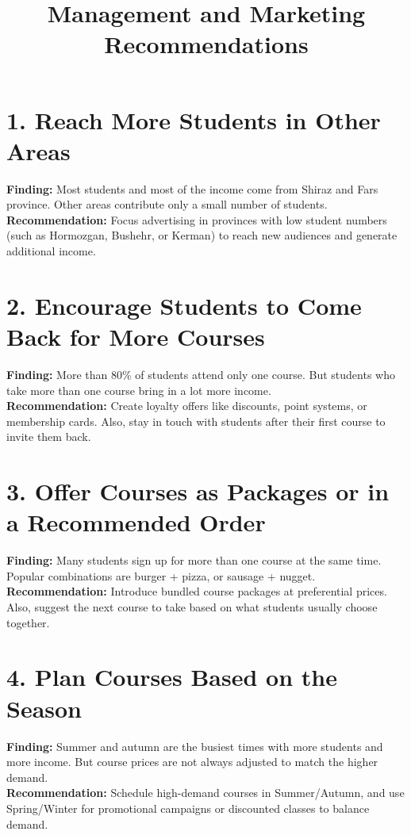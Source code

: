 \documentclass[12pt,a4paper]{article}
\title{Management and Marketing Recommendations}
\date{}
\begin{document}
\maketitle



\section*{1.  Reach More Students in Other Areas}
\textbf{Finding:} Most students and most of the income come from Shiraz and Fars province. Other areas contribute only a small number of students. \\
\textbf{Recommendation:} Focus advertising in provinces with low student numbers (such as Hormozgan, Bushehr, or Kerman) to reach new audiences and generate additional income.

\section*{2. Encourage Students to Come Back for More Courses}
\textbf{Finding:} More than 80\% of students attend only one course. But students who take more than one course bring in a lot more income. \\
\textbf{Recommendation:} Create loyalty offers like discounts, point systems, or membership cards. Also, stay in touch with students after their first course to invite them back.

\section*{3. Offer Courses as Packages or in a Recommended Order}
\textbf{Finding:} Many students sign up for more than one course at the same time. Popular combinations are burger + pizza, or sausage + nugget. \\
\textbf{Recommendation:} Introduce bundled course packages at preferential prices. Also, suggest the next course to take based on what students usually choose together.

\section*{4. Plan Courses Based on the Season}
\textbf{Finding:} Summer and autumn are the busiest times with more students and more income. But course prices are not always adjusted to match the higher demand. \\
\textbf{Recommendation:} Schedule high-demand courses in Summer/Autumn, and use Spring/Winter for promotional campaigns or discounted classes to balance demand.
\end{document}
